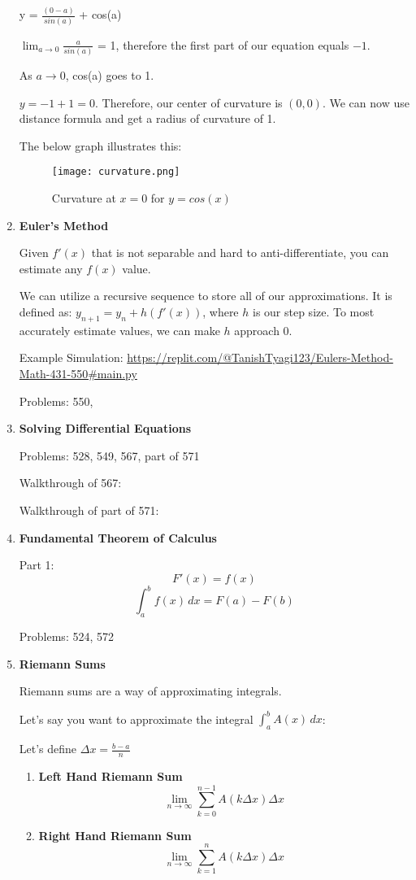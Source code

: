 \documentclass[11pt,twoside]{article}
\begin{document}
\begin{enumerate}
y = \(\frac{(0-a)}{sin(a)}\) + cos(a)

\(\lim_{a\to0} \frac{a}{sin(a)}\) = 1, therefore the first part of our equation equals $-1$. 

As $a \rightarrow\text{0}$, cos(a) goes to 1. 

$y = -1 + 1 = 0.$ Therefore, our center of curvature is $(0,0).$ We can now use distance formula and get a radius of curvature of 1. 

The below graph illustrates this:

\begin{figure}[H]
\centering
\texttt{[image: curvature.png]}
\caption{Curvature at $x = 0$ for $y = cos(x)$ }
\end{figure}


\item \textbf{Euler's Method}

Given $f'(x)$ that is not separable and hard to anti-differentiate, you can estimate any $f(x)$ value. 

We can utilize a recursive sequence to store all of our approximations. It is defined as: $y_{n+1} = y_{n} + h(f'(x))$, where $h$ is our step size. To most accurately estimate values, we can make $h$ approach 0.

Example Simulation: \url{https://replit.com/@TanishTyagi123/Eulers-Method-Math-431-550#main.py}

Problems: 550, 

\item \textbf{Solving Differential Equations}

Problems: 528, 549, 567, part of 571

Walkthrough of 567: 

Walkthrough of part of 571:


\item \textbf{Fundamental Theorem of Calculus} 

Part 1: 
$$ F'(x) = f(x) $$
$$ \int_{a}^{b} f(x) \,dx = F(a) - F(b) $$

Problems: 524, 572

\item \textbf{Riemann Sums}

Riemann sums are a way of approximating integrals. 

Let's say you want to approximate the integral $\int_{a}^{b} A(x) \,dx$: 

Let's define $\Delta x = \frac{b - a}{n}$

    \begin{enumerate}
    \item \textbf{Left Hand Riemann Sum}
$$
\lim_{n\to\infty} \sum_{k=0} ^{n-1} A(k\Delta x)\Delta x 
$$
    \item \textbf{Right Hand Riemann Sum}
$$
\lim_{n\to\infty} \sum_{k=1} ^{n} A(k\Delta x)\Delta x 
$$


\end{enumerate}
\end{enumerate}
\end{document}

